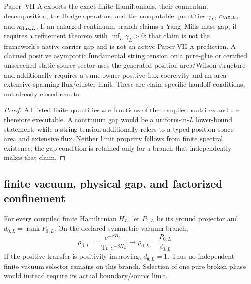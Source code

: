 \documentclass[12pt,a4paper]{article}
\begin{document}
\begin{theorem}
\label{p10:thm:mass-gap-confinement-closure-map}
Paper~VII-A exports the exact finite Hamiltonians, their commutant decomposition, the Hodge operators, and the computable quantities \(\gamma_L\), \(\kappa_{\YM,L}\), and \(\kappa_{{\rm flux},L}\).  If an enlarged continuum branch claims a Yang--Mills mass gap, it requires a refinement theorem with \(\inf_L\gamma_L>0\); that claim is not the framework's native carrier gap and is not an active Paper-VII-A prediction.  A claimed positive asymptotic fundamental string tension on a pure-glue or certified unscreened static-source sector uses the generated position-area/Wilson structure and additionally requires a same-owner positive flux coercivity and an area-extensive spanning-flux/cluster limit.  These are claim-specific handoff conditions, not already closed results.
\end{theorem}
\begin{proof}
All listed finite quantities are functions of the compiled matrices and are therefore executable.  A continuum gap would be a uniform-in-$L$ lower-bound statement, while a string tension additionally refers to a typed position-space area and extensive flux.  Neither limit property follows from finite spectral existence; the gap condition is retained only for a branch that independently makes that claim.
\end{proof}


\subsection{finite vacuum, physical gap, and factorized confinement}
\label{p10:sec:v164-vacuum-gap-confinement}

\begin{theorem}
\label{p10:thm:v164-generated-finite-vacuum}
For every compiled finite Hamiltonian \(H_L\), let \(P_{0,L}\) be its ground
projector and \(d_{0,L}=\operatorname{rank}P_{0,L}\).  On the declared
symmetric vacuum branch,
\[
 \rho_{\beta,L}
 =\frac{e^{-\beta H_L}}{\operatorname{Tr}e^{-\beta H_L}}
 \longrightarrow
 \rho_{0,L}=\frac{P_{0,L}}{d_{0,L}}.
\]
If the positive transfer is positivity improving, \(d_{0,L}=1\).  Thus no
independent finite vacuum selector remains on this branch.  Selection of one
pure broken phase would instead require its actual boundary/source limit.
\end{theorem}
\end{document}
